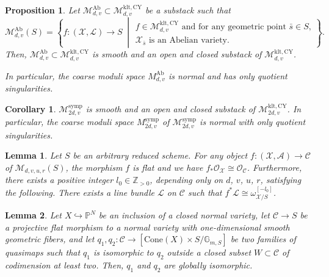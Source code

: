 \documentclass[10pt,a4paper]{amsart}
\newtheorem{prop}{Proposition}
\newtheorem{cor}{Corollary}
\newtheorem{lem}{Lemma}
\begin{document}
\begin{prop}\label{prop--smoothness--of--Abelian--moduli}
    Let $\mathcal{M}^{\mathrm{Ab}}_{d,v}\subset\mathcal{M}^{\mathrm{klt,CY}}_{d,v}$ be a substack such that 
     \[\mathcal{M}^{\mathrm{Ab}}_{d,v}(S)=
\left\{
 f\colon(\mathcal{X},\mathcal{L})\to S
\;\middle|
\begin{array}{l}
\text{$f\in\mathcal{M}^{\mathrm{klt,CY}}_{d,v}$ and for any geometric point $\bar{s}\in S$,}\\
\text{$\mathcal{X}_{\bar{s}}$ is an Abelian variety.}
\end{array}\right\}.
    \]
    Then, $\mathcal{M}_{d,v}^{\mathrm{Ab}}\subset\mathcal{M}^{\mathrm{klt,CY}}_{d,v}$ is smooth and an open and closed substack of $\mathcal{M}^{\mathrm{klt,CY}}_{d,v}$.

    In particular, the coarse moduli space $M_{d,v}^{\mathrm{Ab}}$ is normal and has only quotient singularities.
\end{prop}

\begin{cor}\label{cor--hk--moduli--normal}
    $\mathcal{M}^{\mathrm{symp}}_{2d,v}$ is smooth and an open and closed substack of $\mathcal{M}^{\mathrm{klt,CY}}_{2d,v}$.
    In particular, the coarse moduli space $M^{\mathrm{symp}}_{2d,v}$ of $\mathcal{M}^{\mathrm{symp}}_{2d,v}$ is normal with only quotient singularities.
\end{cor}

\begin{lem}\label{lem--stein--factorizaton}
Let $S$ be an arbitrary reduced scheme.
    For any object $f\colon (\mathcal{X},\mathscr{A})\to\mathcal{C}$ of $\mathcal{M}_{d,v,u,r}(S)$, the morphism $f$ is flat and we have $f_*\mathcal{O}_{\mathcal{X}}\cong\mathcal{O}_{\mathcal{C}}$.
    Furthermore, there exists a positive integer $l_0\in\mathbb{Z}_{>0}$, depending only on $d$, $v$, $u$, $r$, satisfying the following.
     There exists a line bundle $\mathscr{L}$ on $\mathcal{C}$ such that $f^*\mathscr{L}\cong \omega_{\mathcal{X}/S}^{[-l_0]}$.
  \end{lem}

\begin{lem}\label{lem--quasi--map--S_2}
    Let $X\hookrightarrow \mathbb{P}^N$ be an inclusion of a closed normal variety, let $\mathcal{C}\to S$ be a projective flat morphism to a normal variety with one-dimensional smooth geometric fibers, and let $q_1,q_2\colon\mathcal{C}\to[\mathrm{Cone}(X)\times S/\mathbb{G}_{m,S}]$ be two families of quasimaps such that $q_1$ is isomorphic to $q_2$ outside a closed subset $W\subset \mathcal{C}$ of codimension at least two.
    Then, $q_1$ and $q_2$ are globally isomorphic. 
\end{lem}
\end{document}
